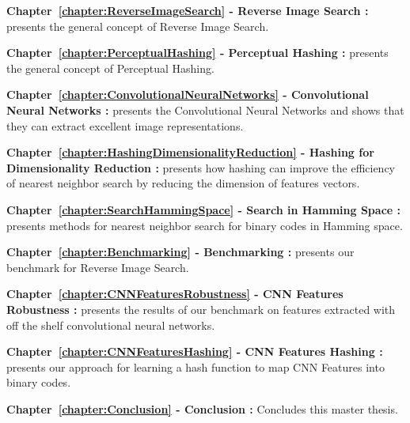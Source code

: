 \begin{description}
\item\textbf{Chapter~\ref{chapter:ReverseImageSearch} - Reverse Image Search :} presents the general concept of Reverse Image Search.
\item\textbf{Chapter~\ref{chapter:PerceptualHashing} - Perceptual Hashing :} presents the general concept of Perceptual Hashing.
\item\textbf{Chapter~\ref{chapter:ConvolutionalNeuralNetworks} - Convolutional Neural Networks :} presents the Convolutional Neural Networks and shows that they can extract excellent image representations.
\item\textbf{Chapter~\ref{chapter:HashingDimensionalityReduction} - Hashing for Dimensionality Reduction :} presents how hashing can improve the efficiency of nearest neighbor search by reducing the dimension of features vectors.
\item\textbf{Chapter~\ref{chapter:SearchHammingSpace} - Search in Hamming Space :} presents methods for nearest neighbor search for binary codes in Hamming space.
\item\textbf{Chapter~\ref{chapter:Benchmarking} - Benchmarking :} presents our benchmark for Reverse Image Search.
\item\textbf{Chapter~\ref{chapter:CNNFeaturesRobustness} - CNN Features Robustness :} presents the results of our benchmark on features extracted with off the shelf convolutional neural networks.
\item\textbf{Chapter~\ref{chapter:CNNFeaturesHashing} - CNN Features Hashing :} presents our approach for learning a hash function to map CNN Features into binary codes.
\item\textbf{Chapter~\ref{chapter:Conclusion} - Conclusion :} Concludes this master thesis.
\end{description}